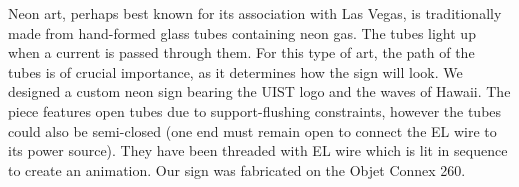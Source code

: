 Neon art, perhaps best known for its association with Las Vegas, is traditionally made from hand-formed glass tubes containing neon gas.  The tubes light up when a current is passed through them.  For this type of art, the path of the tubes is of crucial importance, as it determines how the sign will look.  We designed a custom neon sign bearing the UIST logo and the waves of Hawaii.  The piece features open tubes due to support-flushing constraints, however the tubes could also be semi-closed (one end must remain open to connect the EL wire to its power source).  They have been threaded with EL wire which is lit in sequence to create an animation.  Our sign was fabricated on the Objet Connex 260.
